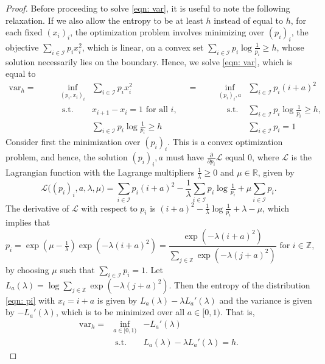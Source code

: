 \documentclass[11pt]{article}
\newcommand{\calI}{\mathcal{I}}
\newcommand{\calL}{\mathcal{L}}
\newcommand{\var}{\mathrm{var}}
\newcommand{\bbR}{\mathbb{R}}
\newcommand{\bbZ}{\mathbb{Z}}
\begin{document}
\begin{proof}
		Before proceeding to solve \eqref{eqn: var}, it is useful to note the following relaxation. If we also allow the entropy to be at least $h$ instead of equal to $h$, for each fixed $(x_i)_i$, the optimization problem involves minimizing over $(p_i)_i$, the objective $\sum_{i \in \calI} p_i x_i^2$, which is linear, on a convex set $\sum_{i \in \calI} p_i \log \tfrac1{p_i} \geq h$, whose solution necessarily lies on the boundary. Hence, we solve \eqref{eqn: var}, which is equal to 
		\begin{equation*}    
			\begin{aligned}
				\var_h = \qquad  &\inf_{(p_i, x_i)_i} &\sum_{i \in \calI} p_i x_i^2 & \qquad= &  &\quad \inf_{(p_i)_i, a} &\sum_{i \in \calI} p_i (i + a)^2  \\
				&\ \text{s.t.} & x_{i+1} - x_i = 1 \text{ for all } i,  &  & &\qquad \text{s.t.} & \sum_{i \in \calI} p_i \log \tfrac1{p_i} \geq h,\\
				&& \sum_{i \in \calI} p_i \log \tfrac1{p_i} \geq h &&&& \sum_{i \in \calI} p_i = 1
			\end{aligned}
		\end{equation*}
		Consider first the minimization over $(p_i)_i$.
		This is a convex optimization problem, and hence, the solution $(p_i)_i, a$ must have $\frac{\partial}{\partial p_i} \calL$ equal 0, where $\calL$ is the Lagrangian function with the Lagrange multipliers $\frac1{\lambda} \geq 0$ and $\mu \in \bbR$, given by
		\begin{equation*}
			\calL\big((p_i)_i, a, \lambda, \mu\big) = \sum_{i \in \calI} p_i ( i+a)^2 - \frac1{\lambda} \sum_{i \in \calI} p_i \log \tfrac1{p_i} + \mu \sum_{i \in \calI} p_i.
		\end{equation*}
		The derivative of $\calL$ with respect to $p_i$ is $(i+a)^2 - \frac1{\lambda} \log\frac1{p_i} + \lambda - \mu$, which implies that
		\begin{equation}    
			p_i = \exp(\mu - \tfrac1{\lambda}) \exp(- \lambda(i+a)^2) = \frac{\exp(- \lambda (i+a)^2)}{\sum_{j\in\bbZ} \exp(- \lambda (j+a)^2)} \text{ for } i \in \bbZ, \label{eqn: pi}
		\end{equation}
		by choosing $\mu$ such that $\sum_{i \in \calI} p_i = 1$. Let $L_a(\lambda) = \log \sum_{j \in \bbZ} \exp(- \lambda (j+a)^2)$. Then the entropy of the distribution \eqref{eqn: pi} with $x_i = i+a$ is given by $L_a(\lambda) - \lambda L_a'(\lambda)$ and the variance is given by $- L_a'(\lambda)$, which is to be minimized over all $a \in [0,1)$. That is,
		\begin{equation*}    
			\begin{aligned}
				\var_h =  &\inf_{a \in [0,1)} &  -L_a'(\lambda) \\
				\qquad  &\ \text{s.t.} & L_a(\lambda) - \lambda L_a'(\lambda) = h.
			\end{aligned}
		\end{equation*}
		

\end{proof}
\end{document}
